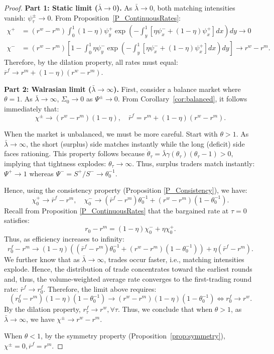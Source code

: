 \begin{proof}
\textbf{Part 1: Static limit ($\bar{\lambda} \to 0$).} As $\bar{\lambda} \to 0$, both matching intensities vanish: $\psi_{\tau}^{\pm}  \to 0$. From Proposition~\ref{P_ContinuousRates}:
\begin{align*}
\chi^{+} &= (r^{w} - r^{m})\int_{0}^{1}(1-\eta)\psi_{y}^{+}\exp\left(-\int_{y}^{1}[\eta\psi_{x}^{-} + (1-\eta)\psi_{x}^{+}]dx\right)dy \to 0\\
\chi^{-} &= (r^{w} - r^{m})\left[1 - \int_{0}^{1}\eta\psi_{y}^{-}\exp\left(-\int_{y}^{1}[\eta\psi_{x}^{-} + (1-\eta)\psi_{x}^{+}]dx\right)dy\right] \to r^{w} - r^{m}.
\end{align*}
Therefore, by the dilation property, all rates must equal: $\overline{r}^{f} \to r^{m} + (1-\eta)(r^{w} - r^{m})$.

\textbf{Part 2: Walrasian limit ($\bar{\lambda} \to \infty$).} First, consider a balance market where $\theta = 1$. As $\bar{\lambda} \to \infty$, $\Sigma_0\to0$ as $\Psi^{\pm}\to0$. From Corollary~\ref{cor:balanced}, it follows immediately that:
\[
\chi^{\pm} \to (r^{w} - r^{m})(1-\eta),\quad \bar{r}^f =r^m+ (1-\eta)(r^{w} - r^{m}).
\]

When the market is unbalanced, we must be more careful. Start with $\theta > 1$. As $\bar{\lambda} \to \infty$, the short (surplus) side matches instantly while the long (deficit) side faces rationing. This property follows because $\dot{\theta}_{\tau} = \bar{\lambda}\gamma(\theta_{\tau})(\theta_{\tau} - 1) > 0$, implying that tightness explodes: $\theta_{\tau} \to \infty.$
Thus, surplus traders match instantly: $\Psi^{+} \to 1$ whereas $\Psi^{-} = S^{+}/S^{-} \to \theta_{0}^{-1}.$

Hence, using the consistency property (Proposition \ref{P_Consistency}), we have:
\[
\chi_0^{+} \to \bar{r}^f - r^{m}, \quad \chi_0^{-} \to (\bar{r}^f - r^{m})\theta_{0}^{-1}+(r^w-r^m)(1-\theta_{0}^{-1}).
\]
Recall from Proposition \ref{P_ContinuousRates} that the bargained rate at $\tau=0$ satisfies:
\[
r_0-r^m=(1-\eta)\chi^{-}_0+\eta\chi^{+}_0. 
\]
Thus, as efficiency increases to infinity:
\[
r^f_0-r^m\to(1-\eta)((\bar{r}^f - r^{m})\theta_{0}^{-1}+(r^w-r^m)(1-\theta_{0}^{-1}))+\eta(\bar{r}^f - r^{m}).
\]
We further know that as $\bar{\lambda}\to \infty$, trades occur faster, i.e., matching intensities explode. Hence, the distribution of trade concentrates toward the earliest rounds and, thus, the volume-weighted average rate converges to the first-trading round rate: $\bar{r}^f \to r^f_0$. Therefore, the limit above requires:
\[
(r^f_0-r^m)(1-\eta)(1-\theta_{0}^{-1})\to(r^w-r^m)(1-\eta)(1-\theta_{0}^{-1})\Leftrightarrow r^f_0\to r^w.
\]
By the dilation property, $r^f_\tau\to r^w,\forall \tau$. Thus, we conclude that when $\theta>1$, as $\bar{\lambda}\to\infty$, we have $\chi^{\pm} \to r^w - r^{m}$.

When $\theta<1$, by the symmetry property (Proposition~\ref{prop:symmetry}),  $\chi^{\pm} = 0, \overline{r}^{f} = r^{m}.$
\end{proof}